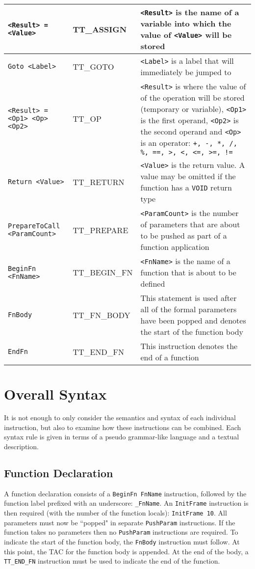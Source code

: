\begin{longtable}{|p{5.5cm}|p{3.5cm}|p{7cm}|}
	\verb!<Result> = <Value>! & TT\_ASSIGN & \verb!<Result>! is the name of a variable into which the value of \verb!<Value>! will be stored\\ \hline
	\verb!Goto <Label>! & TT\_GOTO & \verb!<Label>! is a label that will immediately be jumped to\\ \hline
	\verb!<Result> = <Op1> <Op> <Op2>! & TT\_OP & \verb!<Result>! is where the value of of the operation will be stored (temporary or variable), \verb!<Op1>! is the first operand, \verb!<Op2>! is the second operand and \verb!<Op>! is an operator: \verb`+, -, *, /, %, ==, >, <, <=, >=, !=`\\ \hline
	\verb!Return <Value>! & TT\_RETURN & \verb!<Value>! is the return value. A value may be omitted if the function has a \verb!VOID! return type\\ \hline
	\verb!PrepareToCall <ParamCount>! & TT\_PREPARE & \verb!<ParamCount>! is the number of parameters that are about to be pushed as part of a function application\\ \hline
	\verb!BeginFn <FnName>! & TT\_BEGIN\_FN & \verb!<FnName>! is the name of a function that is about to be defined\\ \hline	
	\verb!FnBody! & TT\_FN\_BODY & This statement is used after all of the formal parameters have been popped and denotes the start of the function body\\ \hline
	\verb!EndFn! & TT\_END\_FN & This instruction denotes the end of a function\\ \hline	
\end{longtable}

\section{Overall Syntax}

It is not enough to only consider the semantics and syntax of each individual instruction, but also to examine how these instructions can be combined. Each syntax rule is given in terms of a pseudo grammar-like language and a textual description.

\subsection{Function Declaration}
A function declaration consists of a \verb!BeginFn FnName! instruction, followed by the function label prefixed with an underscore: \verb!_FnName!. An \verb!InitFrame! instruction is then required (with the number of the function locals): \verb!InitFrame 10!. All parameters must now be ``popped" in separate \verb!PushParam! instructions. If the function takes no parameters then no \verb!PushParam! instructions are required. To indicate the start of the function body, the \verb!FnBody! instruction must follow. At this point, the TAC for the function body is appended. At the end of the body, a \verb!TT_END_FN! instruction must be used to indicate the end of the function.

